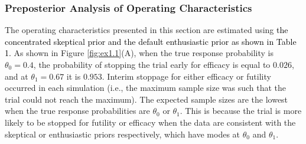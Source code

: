 \documentclass[12pt]{article}
\begin{document}
\subsubsection{Preposterior Analysis of Operating Characteristics}\label{sec:ex1.1}
The operating characteristics presented in this section are estimated using \textcolor{black}{the concentrated skeptical prior and the default enthusiastic prior as shown in Table 1.}
%
As shown in Figure \ref{fig:ex1.1}(A), when the true response probability is $\theta_0=0.4$, the probability of stopping the trial early for efficacy is equal to $0.026$, and at $\theta_1=0.67$ it is $0.953$. 
%
Interim stoppage for either efficacy or futility occurred in each simulation (i.e., the maximum sample size was such that the trial could not reach the maximum). The expected sample sizes are the lowest when the true response probabilities are $\theta_0$ or $\theta_1$. This is because the trial is more likely to be stopped for futility or efficacy when the data are consistent with the skeptical or enthusiastic priors respectively, which have modes at $\theta_0$ and $\theta_1$. 
%
%
%
%
\end{document}

